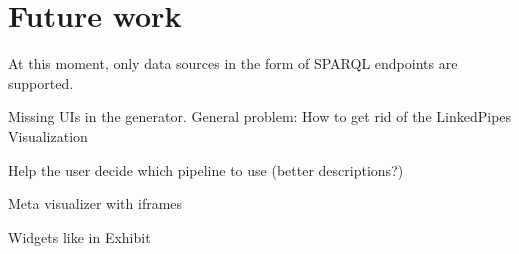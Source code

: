 \chapter{Future work}

At this moment, only data sources in the form of SPARQL endpoints are supported.

Missing UIs in the generator. General problem: How to get rid of the LinkedPipes Visualization

Help the user decide which pipeline to use (better descriptions?)

Meta visualizer with iframes

Widgets like in Exhibit
